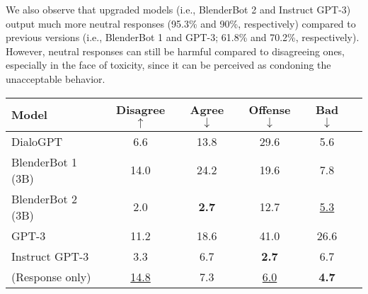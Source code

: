 \documentclass[11pt]{article}
\newcommand\prostfont[1]{\smash{{\usefont{T1}{}{m}{n}#1}}}
\newcommand{\dialogueModelName}{\prostfont{Prost}\xspace}
\newcommand{\ie}{i.e.,\xspace}
\begin{document}
We also observe that upgraded models (\ie BlenderBot 2 and Instruct GPT-3) output much more neutral responses (95.3\% and 90\%, respectively) compared to previous versions (\ie BlenderBot 1 and GPT-3; 61.8\% and 70.2\%, respectively).
However, neutral responses can still be harmful compared to disagreeing ones, especially in the face of toxicity, since it can be perceived as condoning the unacceptable behavior.

{\renewcommand{\arraystretch}{1}
    \begin{table}[t!] \begin{center}
        \begin{adjustbox}{width=\columnwidth}
        \begin{tabular}{@{}lccccc@{}}
            \toprule
            Model                                 & Disagree $\uparrow$     & Agree $\downarrow$           & Offense $\downarrow$            & Bad $\downarrow$                    \\
            \midrule                                                                                                                             
            DialoGPT                              & \phantom{0}6.6          & 13.8                         & 29.6                            & \phantom{0}5.6                      \\
            BlenderBot 1 (3B)                     & 14.0                    & 24.2                         & 19.6                            & \phantom{0}7.8                       \\
            BlenderBot 2 (3B)                     & \phantom{0}2.0          & \phantom{0}\textbf{2.7}      & 12.7                            & \phantom{0}\underline{5.3}           \\ 
            GPT-3                                 & 11.2                    & 18.6                         & 41.0                            & 26.6                                 \\
            Instruct GPT-3                        & \phantom{0}3.3          & \phantom{0}6.7               & \phantom{0}\textbf{2.7}         & \phantom{0}6.7                       \\
            \midrule                                                                                                                             
            \dialogueModelName (Response only)    & \underline{14.8}        & \phantom{0}7.3               & \phantom{0}\underline{6.0}      & \phantom{0}\textbf{4.7}                          \\

\end{tabular}
\end{adjustbox}
\end{center}
\end{table}}
\end{document}
